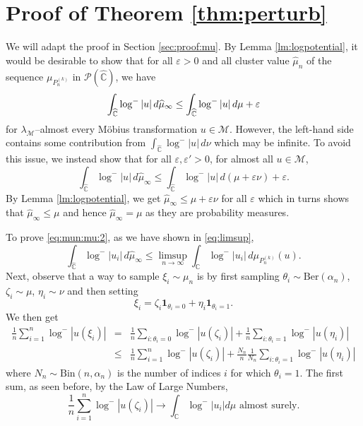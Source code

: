 \documentclass[12pt, reqno]{amsart}
\theoremstyle{plain}
\theoremstyle{definition}
\newcommand\C{{\mathbb{C}}}
\newcommand{\ep}{\varepsilon}
\begin{document}
 
 
 \section{Proof of Theorem \ref{thm:perturb}}
 We will adapt the proof in Section \ref{sec:proof:mu}. By Lemma \ref{lm:logpotential}, it would be desirable to show that for all $\ep>0$ and all cluster value $\hat \mu_n$ of the sequence $\mu_{P_n^{(k)}}$ in $ \mathcal P(\hat \C)$, we have 
 \begin{equation}
 	\int_{\widehat{\mathbb C}} \log^{-}|u|\, d\widehat \mu_\infty \le \int_{\widehat{\mathbb C}} \log^{-}|u|\, d\mu + \ep \notag
 \end{equation}
 for $\lambda_{\mathcal M}$–almost every Möbius transformation  $u \in \mathcal M$. 
 However, the left-hand side contains some contribution from $\int_{\widehat{\mathbb C}} \log^{-}|u|\, d \nu$ which may be infinite. To avoid this issue, we instead show that for all $\ep, \ep'>0$, for almost all $u\in \mathcal M$,
 \begin{equation}
 	\int_{\widehat{\mathbb C}} \log^{-}|u|\, d\widehat \mu_\infty \le \int_{\widehat{\mathbb C}} \log^{-}|u|\, d(\mu+\ep \nu) + \ep.\label{eq:mun:mu:2}
 \end{equation}
 By Lemma \ref{lm:logpotential}, we get $\widehat \mu_\infty \le \mu+\ep \nu$ for all $\ep$ which in turns shows that $\widehat \mu_\infty \le \mu$ and hence $\widehat \mu_\infty = \mu$ as they are probability measures. 
 
 
 To prove \eqref{eq:mun:mu:2}, as we have shown in \eqref{eq:limsup},
 \begin{equation}
 	\int_{\widehat{\mathbb{C}}} \log^- |u_i| \, d\widehat{\mu}_\infty
 	\le \limsup_{n \to \infty} \int_{\mathbb{C}} \log^- |u_i| \, d\mu_{P_{n}^{(k)}}(u). \label{eq:nu1}
 \end{equation}
 Next, observe that a way to sample $\xi_i\sim \mu_n$ is by first sampling $\theta_i\sim \text{Ber}(\alpha_n)$, $\zeta_i\sim \mu$, $\eta_i\sim \nu$ and then setting
 $$\xi_i = \zeta_i \textbf{1}_{\theta_i = 0} + \eta_i \textbf{1}_{\theta_i=1}.$$
 We then get
 \begin{eqnarray*}
 	\frac1n\sum_{i=1}^{n} \log^-|u(\xi_i)| &=& \frac1n\sum_{i: \theta_i=0} \log^-|u(\zeta_i)| + \frac1n\sum_{i: \theta_i=1} \log^-|u(\eta_i)|\\
 	&\le& \frac1n\sum_{i=1}^{n} \log^-|u(\zeta_i)| + \frac{N_n}{n}\frac{1}{N_n}\sum_{i: \theta_i=1} \log^-|u(\eta_i)|
 \end{eqnarray*}
 where $N_n\sim \text{Bin}(n, \alpha_n)$ is the number of indices $i$ for which $\theta_i = 1$.
 The first sum, as seen before, by the Law of Large Numbers,
 \begin{equation}
 	\frac1n\sum_{i=1}^{n} \log^-|u(\zeta_i)| \to \int_{\mathbb{C}} \log^- |u_i|d\mu \text{ almost surely.}\label{eq:nu2}
 \end{equation}
 
\end{document}
